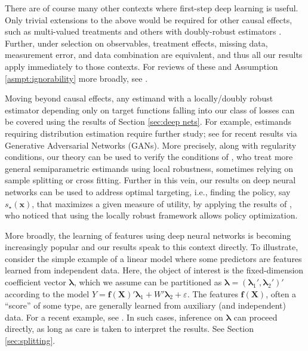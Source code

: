 \documentclass[11pt]{article}
\numberwithin{equation}{section}
\theoremstyle{definition}
\newcommand{\bx}{\bm{x}}
\newcommand{\bX}{\bm{X}}
\begin{document}
	

There are of course many other contexts where first-step deep learning is useful. Only trivial extensions to the above would be required for other causal effects, such as multi-valued treatments \citep[reviewed by][]{Cattaneo2010_JoE} and others with doubly-robust estimators \citep{Sloczynski-Wooldridge2018_ET}. Further, under selection on observables, treatment effects, missing data, measurement error, and data combination are equivalent, and thus all our results apply immediately to those contexts. For reviews of these and Assumption \ref{asmpt:ignorability} more broadly, see \cite{Chen-Hong-Tarozzi2004_WP,Tsiatis2006_book,Heckman-Vytlacil2007a_Handbook,Imbens-Wooldridge2009_JEL}. 


Moving beyond causal effects, any estimand with a locally/doubly robust estimator depending only on target functions falling into our class of losses can be covered using the results of Section \ref{sec:deep nets}. For example, estimands requiring distribution estimation require further study; see \cite{Liang2018_GAN} for recent results via Generative Adversarial Networks (GANs). More precisely, along with regularity conditions, our theory can be used to verify the conditions of \cite{Chernozhukov-etal2018_WP}, who treat more general semiparametric estimands using local robustness, sometimes relying on sample splitting or cross fitting. Further in this vein, our results on deep neural networks can be used to address optimal targeting, i.e., finding the policy, say $s_\star(\bx)$, that maximizes a given measure of utility, by applying the results of \cite{Athey-Wager2018_WP}, who noticed that using the locally robust framework allows policy optimization.
	


More broadly, the learning of features using deep neural networks is becoming increasingly popular and our results speak to this context directly. To illustrate, consider the simple example of a linear model where some predictors are features learned from independent data. Here, the object of interest is the fixed-dimension coefficient vector $\bm{\lambda}$, which we assume can be partitioned as $\bm{\lambda} = (\bm{\lambda}_1', \bm{\lambda}_2')'$ according to the model $Y = \bm{f}(\bX)'\bm{\lambda}_1 + W'\bm{\lambda}_2 + \varepsilon$. The features $\bm{f}(\bX)$, often a ``score'' of some type, are generally learned from auxiliary (and independent) data. For a recent example, see \cite{liu2017large}. In such cases, inference on $\bm{\lambda}$ can proceed directly, as long as care is taken to interpret the results. See Section \ref{sec:splitting}. 
\end{document}
